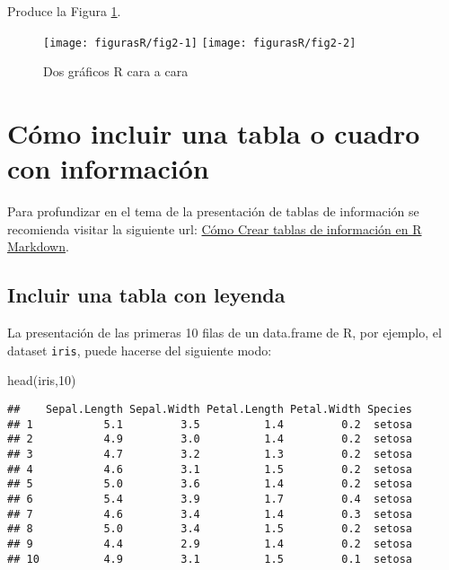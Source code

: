 \documentclass[12pt,a4paper,]{book}
\newenvironment{Shaded}{\begin{snugshade}}{\end{snugshade}}
\newcommand{\DecValTok}[1]{\textcolor[rgb]{0.00,0.00,0.81}{#1}}
\newcommand{\FunctionTok}[1]{\textcolor[rgb]{0.00,0.00,0.00}{#1}}
\newcommand{\NormalTok}[1]{#1}
\numberwithin{dummy}{section}
\theoremstyle{ocrenumbox}
\theoremstyle{blacknumex}
\theoremstyle{blacknumbox}
\theoremstyle{ocrenum}
\theoremstyle{ocrenum}
\begin{document}
Produce la Figura \ref{fig:fig2}.

\begin{figure}[htbp]
 
 {\centering \texttt{[image: figurasR/fig2-1]} \texttt{[image: figurasR/fig2-2]} 
 
 }
 
 \caption{Dos gr\'aficos R cara a cara}\label{fig:fig2}
 \end{figure}

\hypertarget{cuxf3mo-incluir-una-tabla-o-cuadro-con-informaciuxf3n}{%
\section{Cómo incluir una tabla o cuadro con
información}\label{cuxf3mo-incluir-una-tabla-o-cuadro-con-informaciuxf3n}}

Para profundizar en el tema de la presentación de tablas de información
se recomienda visitar la siguiente url:
\href{http://destio.us.es/calvo/post/como-crear-tablas-de-informacion-en-r-markdown/}{Cómo
Crear tablas de información en R Markdown}.

\hypertarget{incluir-una-tabla-con-leyenda}{%
\subsection{Incluir una tabla con
leyenda}\label{incluir-una-tabla-con-leyenda}}

La presentación de las primeras 10 filas de un data.frame de R, por
ejemplo, el dataset \texttt{iris}, puede hacerse del siguiente modo:

\begin{Shaded}
\begin{Highlighting}[]
\FunctionTok{head}\NormalTok{(iris,}\DecValTok{10}\NormalTok{)}
\end{Highlighting}
\end{Shaded}

\begin{verbatim}
##    Sepal.Length Sepal.Width Petal.Length Petal.Width Species
## 1           5.1         3.5          1.4         0.2  setosa
## 2           4.9         3.0          1.4         0.2  setosa
## 3           4.7         3.2          1.3         0.2  setosa
## 4           4.6         3.1          1.5         0.2  setosa
## 5           5.0         3.6          1.4         0.2  setosa
## 6           5.4         3.9          1.7         0.4  setosa
## 7           4.6         3.4          1.4         0.3  setosa
## 8           5.0         3.4          1.5         0.2  setosa
## 9           4.4         2.9          1.4         0.2  setosa
## 10          4.9         3.1          1.5         0.1  setosa
\end{verbatim}
\end{document}
